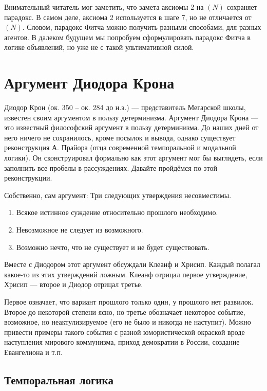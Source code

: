 \documentclass[openany]{book}
\theoremstyle{plain}
\theoremstyle{definition}
\begin{document}
Внимательный читатель мог заметить, что замета аксиомы 2 на \((N)\) сохраняет парадокс. В самом деле, аксиома 2 используется в шаге 7, но не отличается от \((N)\). Словом, парадокс Фитча можно получить разными способами, для разных агентов. В далеком будущем мы попробуем сформулировать парадокс Фитча в логике объявлений, но уже не с такой ультимативной силой.

\section{ Аргумент Диодора Крона }

Диодор Крон (ок. 350 -- ок. 284 до н.э.) --- представитель Мегарской школы, известен своим аргументом в пользу детерминизма. Аргумент Диодора Крона --- это известный философский аргумент в пользу детерминизма. До наших дней от него ничего не сохранилось, кроме посылок и вывода, однако существует реконструкция А. Прайора (отца современной темпоральной и модальной логики). Он сконструировал формально как этот аргумент мог бы выглядеть, если заполнить все пробелы в рассуждениях. Давайте пройдёмся по этой реконструкции.

Собственно, сам аргумент:
Три следующих утверждения несовместимы.
\begin{enumerate}
    \item Всякое истинное суждение относительно прошлого необходимо.
    \item Невозможное не следует из возможного.
    \item Возможно нечто, что не существует и не будет существовать.
\end{enumerate}

Вместе с Диодором этот аргумент обсуждали Клеанф и Хрисип. Каждый полагал какое-то из этих утверждений ложным. Клеанф отрицал первое утверждение, Хрисип --- второе и Диодор отрицал третье.

Первое означает, что вариант прошлого только один, у прошлого нет развилок. Второе до некоторой степени ясно, но третье обозначает некоторое событие, возможное, но неактулизируемое (его не было и никогда не наступит). Можно привести примеры такого события с разной юмористической окраской вроде наступления мирового коммунизма, приход демократии в России, создание Евангелиона и т.п.

\subsection{ Темпоральная логика }
\end{document}
